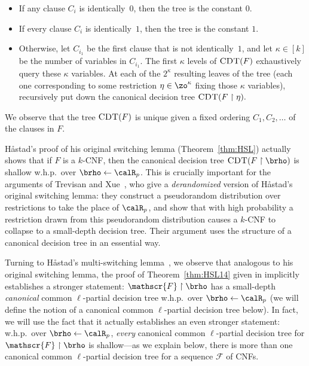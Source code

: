 \documentclass[11pt]{article}
\numberwithin{equation}{section}
\theoremstyle{definition}
\theoremstyle{plain}
\theoremstyle{plain}
\newcommand{\uhr}{\upharpoonright}
\newcommand{\CDT}{\textsc{CDT}}
\begin{document}
\begin{itemize}

\item If any clause $C_i$ is 
%
identically~$0$,  %
then the tree is the constant $0$.  %

\item If every clause $C_i$ is 
%
identically~$1$,  %
then the tree is the constant $1$.   %

\item Otherwise, let $C_{i_1}$ be the first clause that is not identically~$1$, and let $\kappa \in [k]$ be the number of variables in $C_{i_1}$. The first $\kappa$ levels of $\CDT(F)$ exhaustively query these $\kappa$ variables.  At each of the $2^{\kappa}$ resulting leaves of the tree (each one corresponding to some restriction ${\eta} \in \zo^{\kappa}$ fixing those $\kappa$ variables), recursively put down the canonical decision tree $\CDT(F \uhr {\eta}).$

\end{itemize}
We observe that the tree $\CDT(F)$ is unique given a fixed ordering $C_1,C_2,\ldots$ of the clauses in $F$. 


H{\aa}stad's proof of his original switching lemma (Theorem~\ref{thm:HSL}) actually shows that if $F$ is a $k$-CNF, then the canonical decision tree $\CDT(F \uhr \brho)$ is shallow w.h.p.~over $\brho \leftarrow \calR_p$.  This is crucially important for the arguments of Trevisan and Xue~\cite{TX13}, who give a \emph{derandomized} version of H{\aa}stad's original switching lemma:  they construct a pseudorandom distribution over restrictions to take the place of $\calR_p$, and show that with high probability a restriction drawn from this pseudorandom distribution causes a $k$-CNF to collapse to a small-depth decision tree.  Their argument uses the structure of a canonical decision tree in an essential way.

Turning to H{\aa}stad's multi-switching lemma~\cite{Has14}, we observe that analogous to his original switching lemma, the proof of Theorem~\ref{thm:HSL14} given in \cite{Has14} implicitly establishes a stronger statement: $\mathscr{F}\uhr\brho$ has a small-depth \emph{canonical} common $\ell$-partial decision tree w.h.p.~over $\brho\leftarrow\calR_p$ (we will define the notion of a canonical common $\ell$-partial decision tree below).  In fact, we will use the fact that it actually establishes an even stronger statement: w.h.p.~over $\brho\leftarrow\calR_p$,  \emph{every} canonical common $\ell$-partial decision tree for $\mathscr{F}\uhr\brho$ is shallow---as we explain below, there is more than one canonical common $\ell$-partial decision tree for a {sequence} $\mathscr{F}$ of CNFs.
 
\end{document}
